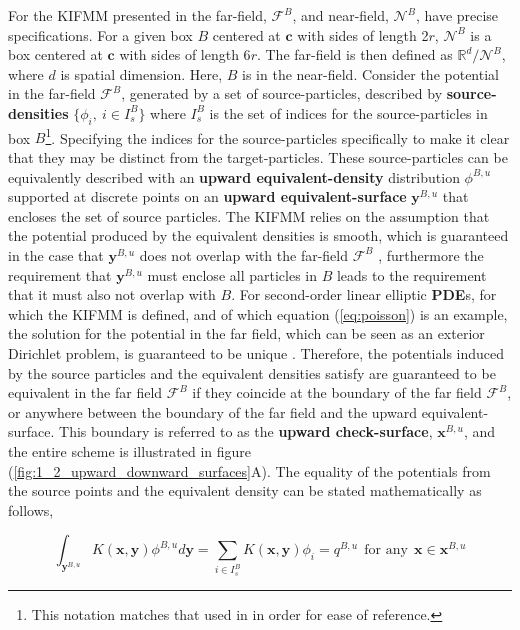 For the \gls{KIFMM} presented in \cite{Ying:2004:JCP} the \gls{far-field}, $\mathcal{F}^B$, and
\gls{near-field}, $\mathcal{N}^B$, have precise specifications. For a given box $B$
centered at $\mathbf{c}$ with sides of length 2$r$, $\mathcal{N}^B$ is a box
centered at $\mathbf{c}$ with sides of length 6$r$. The \gls{far-field} is then
defined as $\mathbb{R}^d / \mathcal{N}^B$, where $d$ is spatial dimension.
Here, $B$ is in the \gls{near-field}. Consider the potential in the \gls{far-field} $\mathcal{F}^B$, generated by a
set of \gls{source-particles}, described by \textbf{\gls{source-densities}}
$\{\phi_i, \> i \in I^B_s \}$ where $I^B_s$ is the set of indices for the \gls{source-particles}
in box $B$\footnote{This notation matches that used in \cite{Ying:2004:JCP}
in order for ease of reference.}. Specifying the indices for the \gls{source-particles}
specifically to make it clear that they may be distinct from the \gls{target-particles}.
These \gls{source-particles} can be equivalently described with an \textbf{upward \gls{equivalent-density}}
distribution $\phi^{B,u}$ supported at discrete points on an \textbf{upward \gls{equivalent-surface}}
$\mathbf{y}^{B, u}$ that encloses the set of source particles. The KIFMM relies
on the assumption that the potential produced by the equivalent densities is smooth,
which is guaranteed in the case that $\mathbf{y}^{B,u}$ does not overlap with the
far-field $\mathcal{F}^B$ \cite{Ying:2004:JCP}, furthermore the requirement that
$\mathbf{y}^{B,u}$ must enclose all particles in $B$ leads to the requirement
that it must also not overlap with $B$. For second-order linear elliptic
\textbf{\gls{PDE}}s, for which the KIFMM is defined,
and of which equation (\ref{eq:poisson}) is an example, the solution for the
potential in the far field, which can be seen as an exterior Dirichlet problem,
is guaranteed to be unique \cite{Ying:2004:JCP}. Therefore, the potentials
induced by the source particles and the equivalent densities satisfy are
guaranteed to be equivalent in the far field $\mathcal{F}^B$ if they coincide
at the boundary of the far field $\mathcal{F}^B$, or anywhere between the boundary
of the far field and the upward \gls{equivalent-surface}. This boundary is referred to
as the \textbf{upward \gls{check-surface}}, $\mathbf{x}^{B, u}$, and the entire
scheme is illustrated in figure (\ref{fig:1_2_upward_downward_surfaces}A).
The equality of the potentials from the source points and the equivalent density
can be stated mathematically as follows,

\begin{equation}
\int_{\mathbf{y}^{B,u}} K(\mathbf{x}, \mathbf{y})\phi^{B, u} d\mathbf{y} = \sum_{i \in I_s^B} K(\mathbf{x}, \mathbf{y})\phi_i = q^{B, u} \> \> \text{for any} \> \> \mathbf{x} \in \mathbf{x}^{B, u}
\label{eq:1_2_p2m}
\end{equation}

